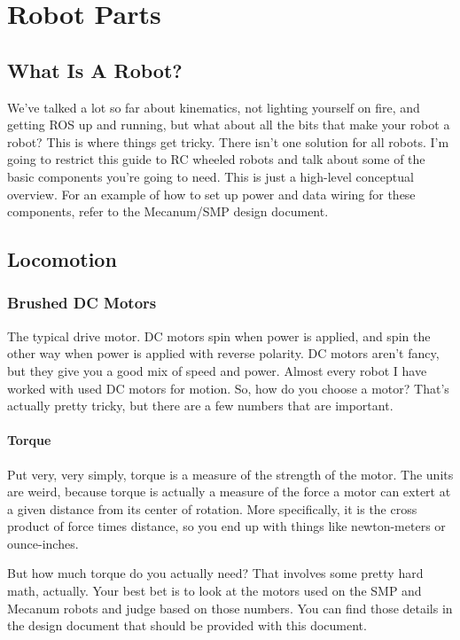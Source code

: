 
\chapter{Robot Parts}
\label{chap:parts}

\section{What Is A Robot?}

We've talked a lot so far about kinematics, not lighting yourself on fire, and getting ROS up and running, but what about all the bits that make your robot a robot? This is where things get tricky. There isn't one solution for all robots. I'm going to restrict this guide to RC wheeled robots and talk about some of the basic components you're going to need. This is just a high-level conceptual overview. For an example of how to set up power and data wiring for these components, refer to the Mecanum/SMP design document.

\section{Locomotion}

\subsection{Brushed DC Motors}

The typical drive motor. DC motors spin when power is applied, and spin the other way when power is applied with reverse polarity. DC motors aren't fancy, but they give you a good mix of speed and power. Almost every robot I have worked with used DC motors for motion. So, how do you choose a motor? That's actually pretty tricky, but there are a few numbers that are important.

\subsubsection{Torque}

Put very, very simply, torque is a measure of the strength of the motor. The units are weird, because torque is actually a measure of the force a motor can extert at a given distance from its center of rotation. More specifically, it is the cross product of force times distance, so you end up with things like newton-meters or ounce-inches.

But how much torque do you actually need? That involves some pretty hard math, actually. Your best bet is to look at the motors used on the SMP and Mecanum robots and judge based on those numbers. You can find those details in the design document that should be provided with this document.

